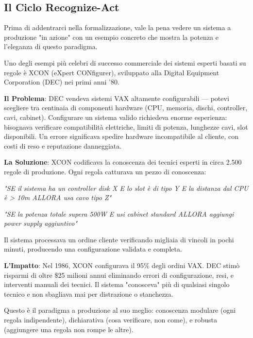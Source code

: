 \subsection{Il Ciclo Recognize-Act}

Prima di addentrarci nella formalizzazione, vale la pena vedere un sistema a produzione "in azione" con un esempio concreto che mostra la potenza e l'eleganza di questo paradigma.

\begin{successbox}
Uno degli esempi più celebri di successo commerciale dei sistemi esperti basati su regole è XCON (eXpert CONfigurer), sviluppato alla Digital Equipment Corporation (DEC) nei primi anni '80.

\textbf{Il Problema}: DEC vendeva sistemi VAX altamente configurabili — potevi scegliere tra centinaia di componenti hardware (CPU, memoria, dischi, controller, cavi, cabinet). Configurare un sistema valido richiedeva enorme esperienza: bisognava verificare compatibilità elettriche, limiti di potenza, lunghezze cavi, slot disponibili. Un errore significava spedire hardware incompatibile al cliente, con costi di reso e reputazione danneggiata.

\textbf{La Soluzione}: XCON codificava la conoscenza dei tecnici esperti in circa 2.500 regole di produzione. Ogni regola catturava un pezzo di conoscenza:

\textit{"SE il sistema ha un controller disk X E lo slot è di tipo Y E la distanza dal CPU è > 10m ALLORA usa cavo tipo Z"}

\textit{"SE la potenza totale supera 500W E usi cabinet standard ALLORA aggiungi power supply aggiuntivo"}

Il sistema processava un ordine cliente verificando migliaia di vincoli in pochi minuti, producendo una configurazione validata e completa.

\textbf{L'Impatto}: Nel 1986, XCON configurava il 95\% degli ordini VAX. DEC stimò risparmi di oltre \$25 milioni annui eliminando errori di configurazione, resi, e interventi manuali dei tecnici. Il sistema "conosceva" più di qualsiasi singolo tecnico e non sbagliava mai per distrazione o stanchezza.

Questo è il paradigma a produzione al suo meglio: conoscenza modulare (ogni regola indipendente), dichiarativa (cosa verificare, non come), e robusta (aggiungere una regola non rompe le altre).
\end{successbox}

